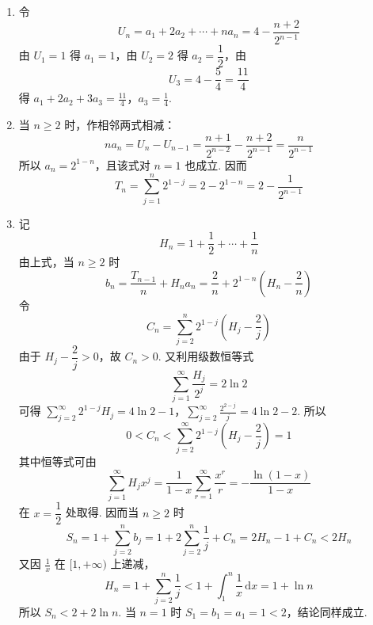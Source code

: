 \begin{solution}
\begin{enumerate}
\item 令
\[
U_n=a_1+2a_2+\cdots+na_n=4-\frac{n+2}{2^{n-1}}
\]
由 \(U_1=1\) 得 \(a_1=1\)，由 \(U_2=2\) 得 \(a_2=\dfrac12\)，由
\[
U_3=4-\frac54=\frac{11}{4}
\]
得
\(a_1+2a_2+3a_3=\frac{11}{4}\)，\(a_3=\frac14\).
\item 当 \(n\geqslant2\) 时，作相邻两式相减：
\[
na_n=U_n-U_{n-1}
=\frac{n+1}{2^{n-2}}-\frac{n+2}{2^{n-1}}
=\frac{n}{2^{n-1}}
\]
所以 \(a_n=2^{1-n}\)，且该式对 \(n=1\) 也成立. 因而
\[
T_n=\sum_{j=1}^n2^{1-j}=2-2^{1-n}=2-\frac1{2^{n-1}}
\]
\item 记
\[
H_n=1+\frac12+\cdots+\frac1n
\]
由上式，当 \(n\geqslant2\) 时
\[
b_n=\frac{T_{n-1}}n+H_na_n
=\frac2n+2^{1-n}\left(H_n-\frac2n\right)
\]
令
\[
C_n=\sum_{j=2}^n2^{1-j}\left(H_j-\frac2j\right)
\]
由于 \(H_j-\dfrac2j>0\)，故 \(C_n>0\). 又利用级数恒等式
\[
\sum_{j=1}^{\infty}\frac{H_j}{2^j}=2\ln2
\]
可得
\(\sum_{j=2}^{\infty}2^{1-j}H_j=4\ln2-1\)，\(\sum_{j=2}^{\infty}\frac{2^{2-j}}j=4\ln2-2\).
所以
\[
0<C_n<\sum_{j=2}^{\infty}2^{1-j}\left(H_j-\frac2j\right)=1
\]
其中恒等式可由
\[
\sum_{j=1}^{\infty}H_jx^j
=\frac1{1-x}\sum_{r=1}^{\infty}\frac{x^r}{r}
=-\frac{\ln(1-x)}{1-x}
\]
在 \(x=\dfrac12\) 处取得. 因而当 \(n\geqslant2\) 时
\[
S_n=1+\sum_{j=2}^n b_j
=1+2\sum_{j=2}^n\frac1j+C_n
=2H_n-1+C_n<2H_n
\]
又因 \(\frac{1}{x}\) 在 \([1,+\infty)\) 上递减，
\[
H_n=1+\sum_{j=2}^n\frac1j
<1+\int_1^n\frac{1}{x}\,\mathrm dx
=1+\ln n
\]
所以 \(S_n<2+2\ln n\). 当 \(n=1\) 时 \(S_1=b_1=a_1=1<2\)，结论同样成立.
\end{enumerate}
\end{solution}
